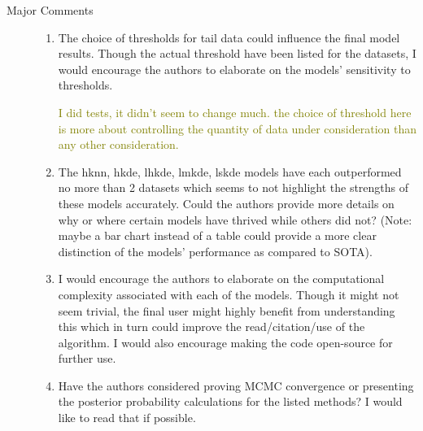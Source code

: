 \documentclass{article}
\newcommand{\comment}[1]{\textcolor{olive}{#1}}
\begin{document}
\begin{description}
    \item[Major Comments]
    \begin{enumerate}
        \item The choice of thresholds for tail data could influence the final model results. 
            Though the actual threshold have been listed for the datasets, I would encourage 
            the authors to elaborate on the models' sensitivity to thresholds.

            \comment{I did tests, it didn't seem to change much.  the choice of threshold here is more about controlling the quantity of data under consideration than any other consideration.}
            
        \item The hknn, hkde, lhkde, lmkde, lskde models have each outperformed no more than 
            2 datasets which seems to not highlight the strengths of these models accurately. 
            Could the authors provide more details on why or where certain models have thrived 
            while others did not? (Note: maybe a bar chart instead of a table could provide a 
            more clear distinction of the models' performance as compared to SOTA).
        \item I would encourage the authors to elaborate on the computational complexity 
            associated with each of the models. Though it might not seem trivial, the final 
            user might highly benefit from understanding this which in turn could improve the 
            read/citation/use of the algorithm. I would also encourage making the code 
            open-source for further use.
        \item Have the authors considered proving MCMC convergence or presenting the posterior 
            probability calculations for the listed methods? I would like to read that if possible.
            

\end{enumerate}
\end{description}
\end{document}
